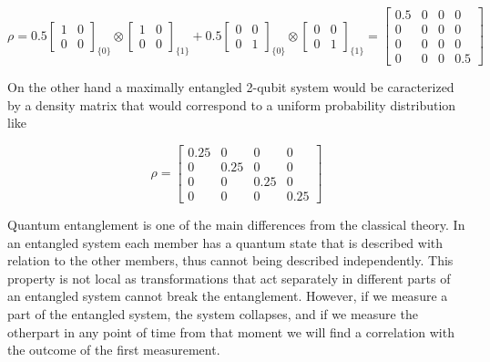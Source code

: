 \begin{equation}
\rho=0.5\left[\begin{array}{cc}
1 & 0\\
0 & 0
\end{array}\right]_{\{0\}}\otimes\left[\begin{array}{cc}
1 & 0\\
0 & 0
\end{array}\right]_{\{1\}}+0.5\left[\begin{array}{cc}
0 & 0\\
0 & 1
\end{array}\right]_{\{0\}}\otimes\left[\begin{array}{cc}
0 & 0\\
0 & 1
\end{array}\right]_{\{1\}}=\left[\begin{array}{cccc}
0.5 & 0 & 0 & 0\\
0 & 0 & 0 & 0\\
0 & 0 & 0 & 0\\
0 & 0 & 0 & 0.5
\end{array}\right]
\end{equation}

On the other hand a maximally entangled 2-qubit system would be caracterized by a density matrix that would correspond to a uniform probability distribution like\cite{Rieffel2011}

\begin{equation}
\rho = \left[\begin{array}{cccc}
0.25 & 0 & 0 & 0\\
0 & 0.25 & 0 & 0\\
0 & 0 & 0.25 & 0\\
0 & 0 & 0 & 0.25
\end{array}\right]
\end{equation}

Quantum entanglement is one of the main differences from the classical theory\cite{Rieffel2011}. In an entangled system each member has a quantum state that is described with relation to the other members, thus cannot being described independently. This property is not local as transformations that act separately in different parts of an entangled system cannot break the entanglement. However, if we measure a part of the entangled system, the system collapses, and if we measure the otherpart in any point of time from that moment we will find a correlation with the outcome of the first measurement.



